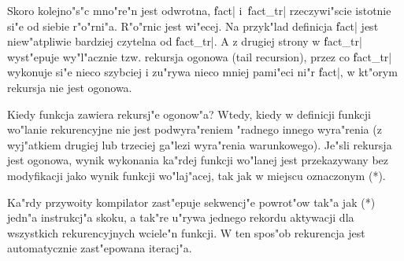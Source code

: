 Skoro kolejno"s"c mno"re"n jest odwrotna, \|fact| i~\|fact_tr|
rzeczywi"scie istotnie si"e od siebie r"o"rni"a.
R"o"rnic jest wi"ecej. Na przyk"lad definicja \|fact| jest
niew"atpliwie bardziej czytelna od \|fact_tr|. 
A z drugiej strony w \|fact_tr| wyst"epuje wy"l"acznie
tzw. rekursja ogonowa (tail recursion),
przez co \|fact_tr| wykonuje si"e nieco szybciej
i zu"rywa nieco mniej pami"eci ni"r \|fact|, w kt"orym rekursja
nie jest ogonowa.

Kiedy funkcja zawiera rekursj"e ogonow"a?
Wtedy, kiedy w definicji funkcji wo"lanie rekurencyjne nie jest podwyra"reniem
"radnego innego wyra"renia (z wyj"atkiem drugiej lub trzeciej ga"lezi 
wyra"renia warunkowego).
Je"sli rekursja jest ogonowa, wynik wykonania ka"rdej 
funkcji wo"lanej jest przekazywany bez modyfikacji jako wynik funkcji
wo"laj"acej, tak jak w miejscu oznaczonym (*).

Ka"rdy przywoity kompilator zast"epuje sekwencj"e
powrot"ow tak"a jak (*) jedn"a instrukcj"a skoku,
a tak"re u"rywa jednego rekordu aktywacji dla wszystkich
rekurencyjnych wciele"n funkcji. W ten spos"ob rekurencja jest
automatycznie zast"epowana iteracj"a.
%
%


